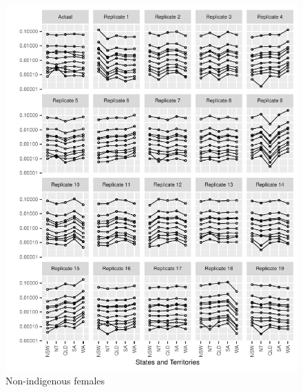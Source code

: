 \documentclass{article}
\begin{document}
\begin{figure}
  \centering
  \includegraphics{out/fig_replicate_data_Female_Non-Indigenous_Baseline}
  \caption{Non-indigenous females}
\end{figure}
\newpage
\end{document}
